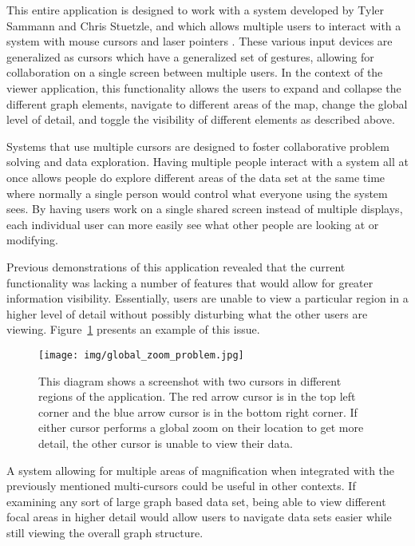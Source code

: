 This entire application is designed to work with a system developed by Tyler Sammann and Chris Stuetzle, and which allows multiple users to interact with a system with mouse cursors and laser pointers \cite{Sammann2013}. These various input devices are generalized as cursors which have a generalized set of gestures, allowing for collaboration on a single screen between multiple users. In the context of the viewer application, this functionality allows the users to expand and
collapse the different graph elements, navigate to different areas of the map, change the global level of detail, and toggle the visibility of different elements as described above.

Systems that use multiple cursors are designed to foster collaborative problem solving and data exploration. Having multiple people interact with a system all at once allows people do explore different areas of the data set at the same time where normally a single person would control what everyone using the system sees. By having users work on a single shared screen instead of multiple displays, each individual user can more easily see what other people are looking at or
modifying.

Previous demonstrations of this application revealed that the current functionality was lacking a number of features that would allow for greater information visibility. Essentially, users are unable to view a particular region in a higher level of detail without possibly disturbing what the other users are viewing. Figure~\ref{fig:example_problem} presents an example of this issue.

\begin{figure}[htp] \centering
    \texttt{[image: img/global\_zoom\_problem.jpg]}
    \caption[Loss of Context]{This diagram shows a screenshot with two cursors in different regions of the application. The red arrow cursor is in the top left corner and the blue arrow cursor is in the bottom right corner. If either cursor performs a global zoom on their location to get more detail, the other cursor is unable to view their data.}
    \label{fig:example_problem}
\end{figure}

A system allowing for multiple areas of magnification when integrated with the previously mentioned multi-cursors could be useful in other contexts. If examining any sort of large graph based data set, being able to view different focal areas in higher detail would allow users to navigate data sets easier while still viewing the overall graph structure.


